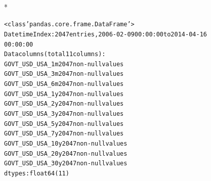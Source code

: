 \documentclass[letterpaper,10pt,english]{/anaconda/lib/python2.7/site-packages/sphinx/texinputs/sphinxhowto}
\def\smaller{\fontsize{9.5pt}{9.5pt}\selectfont}
\newenvironment{InvisibleVerbatim}
        {\begin{mdframed}[leftmargin=0.1\linewidth,innerleftmargin=3pt,innerrightmargin=3pt, userdefinedwidth=1\linewidth, linewidth=0pt, linecolor=white, usetwoside=false]}
        {\end{mdframed}}
\begin{document}
    

        
        

            
                \makebox[0.1\linewidth]{\smaller\hfill\tt\color{nbframe-out-prompt}Out\hspace{4pt}{[}9{]}:\hspace{4pt}}\\*
                \vspace{-2.55\baselineskip}\begin{InvisibleVerbatim}
                \vspace{-0.5\baselineskip}
\begin{alltt}<class 'pandas.core.frame.DataFrame'>
DatetimeIndex: 2047 entries, 2006-02-09 00:00:00 to 2014-04-16
00:00:00
Data columns (total 11 columns):
GOVT\_USD\_USA\_1m     2047  non-null values
GOVT\_USD\_USA\_3m     2047  non-null values
GOVT\_USD\_USA\_6m     2047  non-null values
GOVT\_USD\_USA\_1y     2047  non-null values
GOVT\_USD\_USA\_2y     2047  non-null values
GOVT\_USD\_USA\_3y     2047  non-null values
GOVT\_USD\_USA\_5y     2047  non-null values
GOVT\_USD\_USA\_7y     2047  non-null values
GOVT\_USD\_USA\_10y    2047  non-null values
GOVT\_USD\_USA\_20y    2047  non-null values
GOVT\_USD\_USA\_30y    2047  non-null values
dtypes: float64(11)\end{alltt}

            \end{InvisibleVerbatim}
            
        
    


\end{document}
